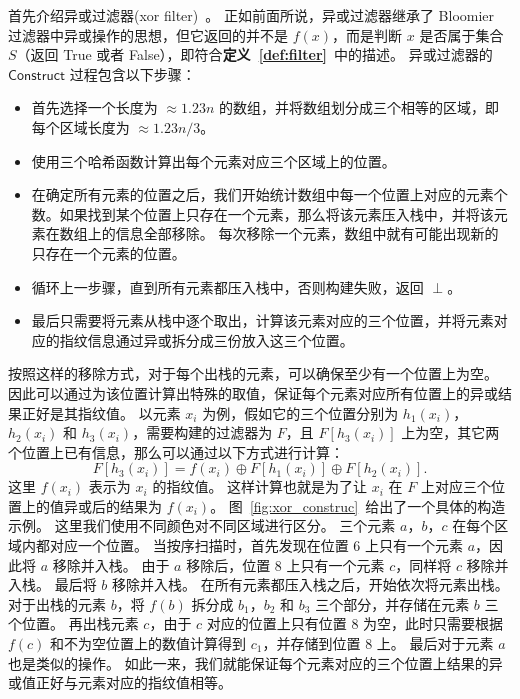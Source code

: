 首先介绍异或过滤器(xor filter)~\cite{graf2020xor}。
正如前面所说，异或过滤器继承了 Bloomier 过滤器中异或操作的思想，但它返回的并不是 $f(x)$，而是判断 $x$ 是否属于集合 $S$（返回 True 或者 False），即符合\textbf{定义~\ref{def:filter}}~中的描述。
异或过滤器的 $\mathsf{Construct}$ 过程包含以下步骤：
\begin{itemize}
  \item 首先选择一个长度为 $\approx 1.23n$ 的数组，并将数组划分成三个相等的区域，即每个区域长度为 $\approx 1.23n/3$。
  \item 使用三个哈希函数计算出每个元素对应三个区域上的位置。
  \item 在确定所有元素的位置之后，我们开始统计数组中每一个位置上对应的元素个数。如果找到某个位置上只存在一个元素，那么将该元素压入栈中，并将该元素在数组上的信息全部移除。
每次移除一个元素，数组中就有可能出现新的只存在一个元素的位置。
  \item 循环上一步骤，直到所有元素都压入栈中，否则构建失败，返回 $\perp$。
  \item 最后只需要将元素从栈中逐个取出，计算该元素对应的三个位置，并将元素对应的指纹信息通过异或拆分成三份放入这三个位置。
\end{itemize}
按照这样的移除方式，对于每个出栈的元素，可以确保至少有一个位置上为空。
因此可以通过为该位置计算出特殊的取值，保证每个元素对应所有位置上的异或结果正好是其指纹值。
以元素 $x_i$ 为例，假如它的三个位置分别为 $h_1(x_i)$，$h_2(x_i)$ 和 $h_3(x_i)$，需要构建的过滤器为 $F$，且 $F[h_3(x_i)]$ 上为空，其它两个位置上已有信息，那么可以通过以下方式进行计算：
\begin{equation}
  F[h_3(x_i)] = f(x_i) \oplus F[h_1(x_i)] \oplus F[h_2(x_i)].
\end{equation}
这里 $f(x_i)$ 表示为 $x_i$ 的指纹值。
这样计算也就是为了让 $x_i$ 在 $F$ 上对应三个位置上的值异或后的结果为 $f(x_i)$。
图~\ref{fig:xor_construc}~给出了一个具体的构造示例。
这里我们使用不同颜色对不同区域进行区分。
三个元素 $a$，$b$，$c$ 在每个区域内都对应一个位置。
当按序扫描时，首先发现在位置 $6$ 上只有一个元素 $a$，因此将 $a$ 移除并入栈。
由于 $a$ 移除后，位置 $8$ 上只有一个元素 $c$，同样将 $c$ 移除并入栈。
最后将 $b$ 移除并入栈。
在所有元素都压入栈之后，开始依次将元素出栈。
对于出栈的元素 $b$，将 $f(b)$ 拆分成 $b_1$，$b_2$ 和 $b_3$ 三个部分，并存储在元素 $b$ 三个位置。
再出栈元素 $c$，由于 $c$ 对应的位置上只有位置 $8$ 为空，此时只需要根据 $f(c)$ 和不为空位置上的数值计算得到 $c_1$，并存储到位置 $8$ 上。
最后对于元素 $a$ 也是类似的操作。
如此一来，我们就能保证每个元素对应的三个位置上结果的异或值正好与元素对应的指纹值相等。

